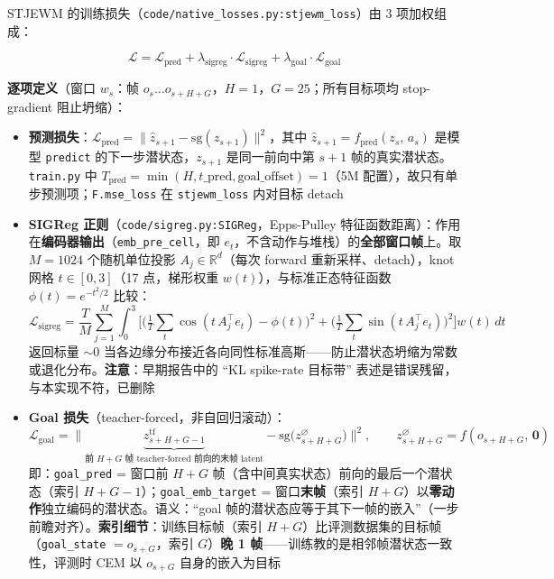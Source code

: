 \documentclass[11pt,a4paper]{article}
\begin{document}
STJEWM 的训练损失（\texttt{code/native\_losses.py:stjewm\_loss}）由 3 项加权组成：

\[
\mathcal{L} = \mathcal{L}_{\text{pred}} + \lambda_{\text{sigreg}} \cdot \mathcal{L}_{\text{sigreg}} + \lambda_{\text{goal}} \cdot \mathcal{L}_{\text{goal}}
\]

\textbf{逐项定义}（窗口 $w_s$：帧 $o_s \ldots o_{s+H+G}$，$H=1$，$G=25$；所有目标项均 stop-gradient 阻止坍缩）：
\begin{itemize}[leftmargin=2em]
    \item \textbf{预测损失}：$\mathcal{L}_{\text{pred}} = \big\|\hat z_{s+1} - \mathrm{sg}(z_{s+1})\big\|^2$，其中 $\hat z_{s+1} = f_{\text{pred}}(z_s,\, a_s)$ 是模型 \texttt{predict} 的下一步潜状态，$z_{s+1}$ 是同一前向中第 $s{+}1$ 帧的真实潜状态。\texttt{train.py} 中 $T_\text{pred} = \min(H, t\_\text{pred}, \text{goal\_offset}) = 1$（5M 配置），故只有单步预测项；\texttt{F.mse\_loss} 在 \texttt{stjewm\_loss} 内对目标 detach
    \item \textbf{SIGReg 正则}（\texttt{code/sigreg.py:SIGReg}，Epps-Pulley 特征函数距离）：作用在\textbf{编码器输出}（\texttt{emb\_pre\_cell}，即 $e_t$，不含动作与堆栈）的\textbf{全部窗口帧}上。取 $M=1024$ 个随机单位投影 $A_j \in \mathbb{R}^d$（每次 forward 重新采样、detach），knot 网格 $t \in [0,3]$（17 点，梯形权重 $w(t)$），与标准正态特征函数 $\phi(t) = e^{-t^2/2}$ 比较：
    \[
    \mathcal{L}_{\text{sigreg}} = \frac{T}{M}\sum_{j=1}^{M} \int_0^3 \Big[\Big(\tfrac{1}{T}\textstyle\sum_t \cos(t\, A_j^\top e_t) - \phi(t)\Big)^2 + \Big(\tfrac{1}{T}\sum_t \sin(t\, A_j^\top e_t)\Big)^2\Big] w(t)\,dt
    \]
    返回标量 $\sim 0$ 当各边缘分布接近各向同性标准高斯——防止潜状态坍缩为常数或退化分布。\textbf{注意}：早期报告中的 ``KL spike-rate 目标带'' 表述是错误残留，与本实现不符，已删除
    \item \textbf{Goal 损失}（teacher-forced，非自回归滚动）：
    \[
    \mathcal{L}_{\text{goal}} = \big\|\underbrace{z^{\text{tf}}_{s+H+G-1}}_{\text{前 }H+G\text{ 帧 teacher-forced 前向的末帧 latent}} - \mathrm{sg}\big(z^{\varnothing}_{s+H+G}\big)\big\|^2,\qquad z^{\varnothing}_{s+H+G} = f(o_{s+H+G},\, \mathbf 0)
    \]
    即：\texttt{goal\_pred} = 窗口前 $H{+}G$ 帧（含中间真实状态）前向的最后一个潜状态（索引 $H{+}G{-}1$）；\texttt{goal\_emb\_target} = 窗口\textbf{末帧}（索引 $H{+}G$）以\textbf{零动作}独立编码的潜状态。语义：``goal 帧的潜状态应等于其下一帧的嵌入''（一步前瞻对齐）。\textbf{索引细节}：训练目标帧（索引 $H{+}G$）比评测数据集的目标帧（\texttt{goal\_state} $= o_{s+G}$，索引 $G$）\textbf{晚 1 帧}——训练教的是相邻帧潜状态一致性，评测时 CEM 以 $o_{s+G}$ 自身的嵌入为目标
\end{itemize}
\end{document}
